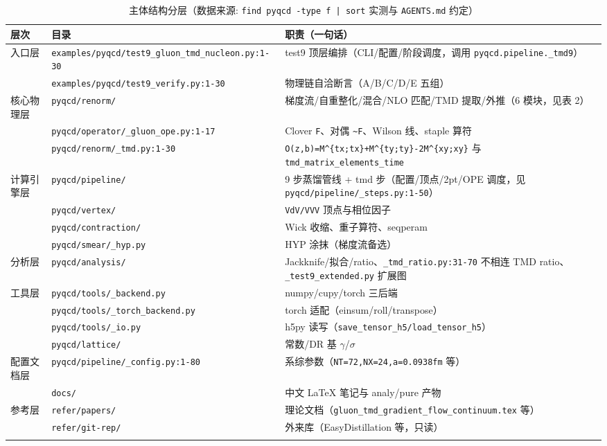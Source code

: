 \documentclass[UTF8]{ctexart}
\begin{document}
\small
\begin{xltabular}{\textwidth}{llX}
\toprule
\textcolor{struct}{层次} & 目录 & \textcolor{struct}{职责（一句话）} \\
\midrule
\endhead
入口层 & \texttt{\nolinkurl{examples/pyqcd/test9\_gluon\_tmd\_nucleon.py:1-30}} & test9 顶层编排（CLI/配置/阶段调度，调用 \texttt{\nolinkurl{pyqcd.pipeline.\_tmd9}}） \\
 & \texttt{\nolinkurl{examples/pyqcd/test9\_verify.py:1-30}} & 物理链自洽断言（A/B/C/D/E 五组） \\
核心物理层 & \texttt{\nolinkurl{pyqcd/renorm/}} & 梯度流/自重整化/混合/NLO 匹配/TMD 提取/外推（6 模块，见表 2） \\
 & \texttt{\nolinkurl{pyqcd/operator/\_gluon\_ope.py:1-17}} & Clover \texttt{\nolinkurl{F}}、对偶 \texttt{\nolinkurl{\~F}}、Wilson 线、staple 算符 \\
 & \texttt{\nolinkurl{pyqcd/renorm/\_tmd.py:1-30}} & \texttt{\nolinkurl{O(z,b)=M^{tx;tx}+M^{ty;ty}-2M^{xy;xy}}} 与 \texttt{\nolinkurl{tmd\_matrix\_elements\_time}} \\
计算引擎层 & \texttt{\nolinkurl{pyqcd/pipeline/}} & 9 步蒸馏管线 + tmd 步（配置/顶点/2pt/OPE 调度，见 \texttt{\nolinkurl{pyqcd/pipeline/\_steps.py:1-50}}） \\
 & \texttt{\nolinkurl{pyqcd/vertex/}} & \texttt{\nolinkurl{VdV/VVV}} 顶点与相位因子 \\
 & \texttt{\nolinkurl{pyqcd/contraction/}} & Wick 收缩、重子算符、seqperam \\
 & \texttt{\nolinkurl{pyqcd/smear/\_hyp.py}} & HYP 涂抹（梯度流备选） \\
分析层 & \texttt{\nolinkurl{pyqcd/analysis/}} & Jackknife/拟合/ratio、\texttt{\nolinkurl{\_tmd\_ratio.py:31-70}} 不相连 TMD ratio、\texttt{\nolinkurl{\_test9\_extended.py}} 扩展图 \\
工具层 & \texttt{\nolinkurl{pyqcd/tools/\_backend.py}} & numpy/cupy/torch 三后端 \\
 & \texttt{\nolinkurl{pyqcd/tools/\_torch\_backend.py}} & torch 适配（einsum/roll/transpose） \\
 & \texttt{\nolinkurl{pyqcd/tools/\_io.py}} & h5py 读写（\texttt{\nolinkurl{save\_tensor\_h5/load\_tensor\_h5}}） \\
 & \texttt{\nolinkurl{pyqcd/lattice/}} & 常数/DR 基 $\gamma$/$\sigma$ \\
配置文档层 & \texttt{\nolinkurl{pyqcd/pipeline/\_config.py:1-80}} & 系综参数（\texttt{\nolinkurl{NT=72,NX=24,a=0.0938fm}} 等） \\
 & \texttt{\nolinkurl{docs/}} & 中文 LaTeX 笔记与 analy/pure 产物 \\
参考层 & \texttt{\nolinkurl{refer/papers/}} & 理论文档（\texttt{\nolinkurl{gluon\_tmd\_gradient\_flow\_continuum.tex}} 等） \\
 & \texttt{\nolinkurl{refer/git-rep/}} & 外来库（EasyDistillation 等，只读） \\
\bottomrule
\caption{主体结构分层（数据来源: \texttt{\nolinkurl{find pyqcd -type f | sort}} 实测与 \texttt{\nolinkurl{AGENTS.md}} 约定）}
\end{xltabular}
\end{document}
